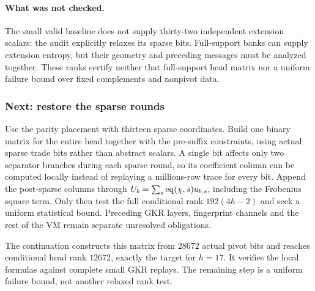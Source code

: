 \paragraph{What was not checked.} The small valid baseline does not supply thirty-two independent extension scalars: the audit explicitly relaxes its sparse bits. Full-support banks can supply extension entropy, but their geometry and preceding messages must be analyzed together. These ranks certify neither that full-support head matrix nor a uniform failure bound over fixed complements and nonpivot data.

\subsubsection{Next: restore the sparse rounds}

Use the parity placement with thirteen sparse coordinates. Build one binary matrix for the entire head together with the pre-suffix constraints, using actual sparse trade bits rather than abstract scalars. A single bit affects only two separator branches during each sparse round, so its coefficient column can be computed locally instead of replaying a millions-row trace for every bit. Append the post-sparse columns through $U_b=\sum_s\operatorname{eq}(\chi,s)u_{b,s}$, including the Frobenius square term. Only then test the full conditional rank $192(4h-2)$ and seek a uniform statistical bound. Preceding GKR layers, fingerprint channels and the rest of the VM remain separate unresolved obligations.

The continuation  constructs this matrix from $28672$ actual pivot bits and reaches conditional head rank $12672$, exactly the target for $h=17$. It verifies the local formulas against complete small GKR replays. The remaining step is a uniform failure bound, not another relaxed rank test.
